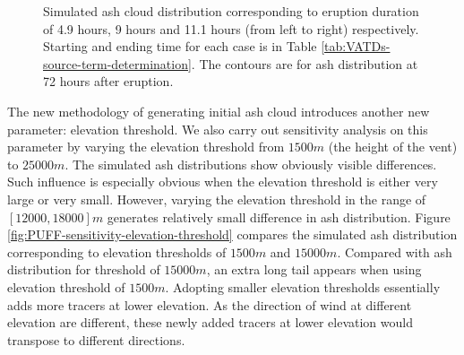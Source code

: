\begin{figure}[!htb]
\begin{minipage}{.325 \textwidth}
    \end{minipage}%
    \caption{Simulated ash cloud distribution corresponding to eruption duration of 4.9 hours, 9 hours and 11.1 hours (from left to right) respectively. Starting and ending time for each case is in Table \ref{tab:VATDs-source-term-determination}. The contours are for ash distribution at 72 hours after eruption.}
    \label{fig:PUFF-sensitivity-duration}
\end{figure}

The new methodology of generating initial ash cloud introduces another new parameter: elevation threshold. We also carry out sensitivity analysis on this parameter by varying the elevation threshold from $1500 m$ (the height of the vent) to $25000 m$. The simulated ash distributions show obviously visible differences. Such influence is especially obvious when the elevation threshold is either very large or very small. However, varying the elevation threshold in the range of $[12000, 18000] m$ generates relatively small difference in ash distribution. Figure \ref{fig:PUFF-sensitivity-elevation-threshold} compares the simulated ash distribution corresponding to elevation thresholds of $1500 m$ and $15000 m$. Compared with ash distribution for threshold of  $15000 m$, an extra long tail appears when using elevation threshold of $1500 m$. Adopting smaller elevation thresholds essentially adds more tracers at lower elevation. As the direction of wind at different elevation are different, these newly added tracers at lower elevation would transpose to different directions.


